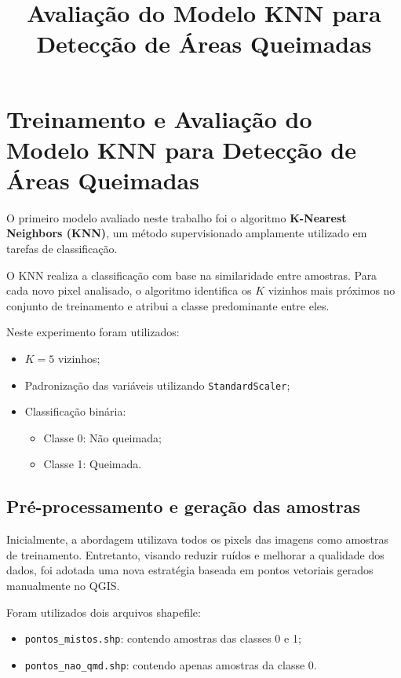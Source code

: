 \documentclass[12pt]{article}
\title{Avaliação do Modelo KNN para Detecção de Áreas Queimadas}
\author{}
\date{}
\begin{document}
\maketitle
\section{Treinamento e Avaliação do Modelo KNN para Detecção de Áreas Queimadas}

O primeiro modelo avaliado neste trabalho foi o algoritmo \textbf{K-Nearest Neighbors (KNN)}, um método supervisionado amplamente utilizado em tarefas de classificação.

O KNN realiza a classificação com base na similaridade entre amostras. Para cada novo pixel analisado, o algoritmo identifica os $K$ vizinhos mais próximos no conjunto de treinamento e atribui a classe predominante entre eles.

Neste experimento foram utilizados:

\begin{itemize}
    \item $K = 5$ vizinhos;
    \item Padronização das variáveis utilizando \texttt{StandardScaler};
    \item Classificação binária:
    \begin{itemize}
        \item Classe 0: Não queimada;
        \item Classe 1: Queimada.
    \end{itemize}
\end{itemize}

\subsection{Pré-processamento e geração das amostras}

Inicialmente, a abordagem utilizava todos os pixels das imagens como amostras de treinamento. Entretanto, visando reduzir ruídos e melhorar a qualidade dos dados, foi adotada uma nova estratégia baseada em pontos vetoriais gerados manualmente no QGIS.

Foram utilizados dois arquivos shapefile:

\begin{itemize}
    \item \texttt{pontos\_mistos.shp}: contendo amostras das classes 0 e 1;
    \item \texttt{pontos\_nao\_qmd.shp}: contendo apenas amostras da classe 0.
\end{itemize}
\end{document}
